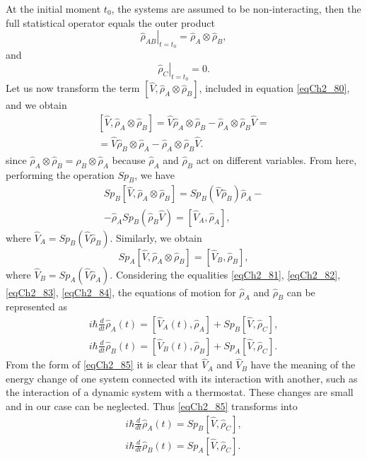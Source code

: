 At the initial moment $t_0$, the systems are assumed to be non-interacting, then the full statistical operator equals the outer product
\[
\left.\hat{\rho}_{AB}\right|_{t = t_0} = \hat{\rho}_{A} \otimes \hat{\rho}_{B},
\] 
and 
\[
\left.\hat{\rho}_{C}\right|_{t = t_0} = 0.
\] 
Let us now transform the term 
$\left[\hat{V}, \hat{\rho}_{A} \otimes \hat{\rho}_{B}\right]$,
included in equation \eqref{eqCh2_80}, and we obtain  
\begin{eqnarray}
\left[\hat{V}, \hat{\rho}_{A} \otimes \hat{\rho}_{B}\right] = 
\hat{V}  \hat{\rho}_{A} \otimes \hat{\rho}_{B} - 
\hat{\rho}_{A} \otimes \hat{\rho}_{B} \hat{V} = 
\nonumber \\
= \hat{V}  \hat{\rho}_{B} \otimes \hat{\rho}_{A} - 
\hat{\rho}_{A} \otimes \hat{\rho}_{B} \hat{V}.
\label{eqCh2_82}
\end{eqnarray}
since 
\(
\hat{\rho}_{A} \otimes \hat{\rho}_{B} = 
\hat{\rho}_{B} \otimes \hat{\rho}_{A}
\)   because $\hat{\rho}_{A}$ and $\hat{\rho}_{B}$ act on
different variables. From here, performing the operation $Sp_B$, we have 
\begin{eqnarray}
Sp_B \left[\hat{V}, \hat{\rho}_{A} \otimes \hat{\rho}_{B}\right] = 
Sp_B\left(\hat{V} \hat{\rho}_{B}\right) \hat{\rho}_{A} - 
\nonumber \\
-
\hat{\rho}_{A} Sp_B \left(\hat{\rho}_{B} \hat{V}\right) = 
\left[\hat{V}_A, \hat{\rho}_A\right],
\label{eqCh2_83}
\end{eqnarray}
where $\hat{V}_A = Sp_B\left(\hat{V}\hat{\rho}_B\right)$. Similarly, we obtain 
\begin{equation}
Sp_A \left[\hat{V}, \hat{\rho}_{A} \otimes \hat{\rho}_{B}\right] =
\left[\hat{V}_B, \hat{\rho}_B\right],
\label{eqCh2_84}
\end{equation}
where $\hat{V}_B= Sp_A\left(\hat{V}\hat{\rho}_A\right)$.  
Considering the equalities \eqref{eqCh2_81}, \eqref{eqCh2_82},
\eqref{eqCh2_83}, \eqref{eqCh2_84}, the equations of motion 
for $\hat{\rho}_{A}$ and $\hat{\rho}_{B}$ can be represented as  
\begin{eqnarray}
i\hbar\frac{d}{d t} \hat{\rho}_A\left(t\right) = 
\left[\hat{V}_A\left(t\right), \hat{\rho}_A\right] +
Sp_B \left[\hat{V}, \hat{\rho}_C\right],
\nonumber \\
i\hbar\frac{d}{d t} \hat{\rho}_B\left(t\right) = 
\left[\hat{V}_B\left(t\right), \hat{\rho}_B\right] +
Sp_A \left[\hat{V}, \hat{\rho}_C\right].
\label{eqCh2_85}
\end{eqnarray}
From the form of \eqref{eqCh2_85} it is clear that $\hat{V}_A$ and $\hat{V}_B$ have
the meaning of the energy change of one system connected with its interaction with
another, such as the interaction of a dynamic system with
a thermostat. These changes are small and in our case can be neglected. Thus \eqref{eqCh2_85} transforms into 
\begin{eqnarray}
i\hbar\frac{d}{d t} \hat{\rho}_A\left(t\right) = 
Sp_B \left[\hat{V}, \hat{\rho}_C\right],
\nonumber \\
i\hbar\frac{d}{d t} \hat{\rho}_B\left(t\right) = 
Sp_A \left[\hat{V}, \hat{\rho}_C\right].
\label{eqCh2_85a}
\end{eqnarray}


